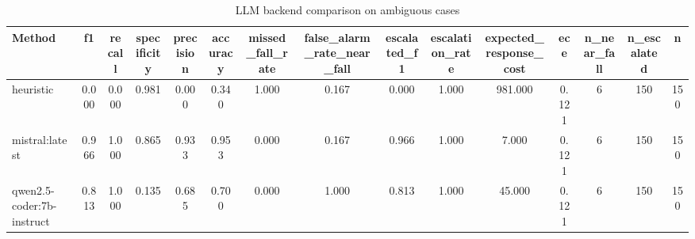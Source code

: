 \begin{table}[t]
\centering
\caption{LLM backend comparison on ambiguous cases}
\begin{tabular}{lcccccccccccccc}
\toprule
Method & f1 & recall & specificity & precision & accuracy & missed_fall_rate & false_alarm_rate_near_fall & escalated_f1 & escalation_rate & expected_response_cost & ece & n_near_fall & n_escalated & n \\
\midrule
heuristic & 0.000 & 0.000 & 0.981 & 0.000 & 0.340 & 1.000 & 0.167 & 0.000 & 1.000 & 981.000 & 0.121 & 6 & 150 & 150 \\
mistral:latest & 0.966 & 1.000 & 0.865 & 0.933 & 0.953 & 0.000 & 0.167 & 0.966 & 1.000 & 7.000 & 0.121 & 6 & 150 & 150 \\
qwen2.5-coder:7b-instruct & 0.813 & 1.000 & 0.135 & 0.685 & 0.700 & 0.000 & 1.000 & 0.813 & 1.000 & 45.000 & 0.121 & 6 & 150 & 150 \\
\bottomrule
\end{tabular}
\end{table}